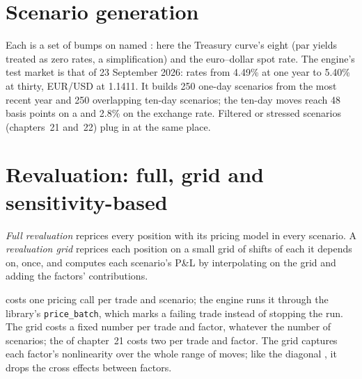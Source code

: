 \section{Scenario generation}

Each  is a set of bumps on named : here the Treasury curve's eight
 (par yields treated as zero rates, a simplification) and the euro--dollar spot rate. The
engine's test market is that of 23 September 2026: rates from 4.49\% at one year to 5.40\% at thirty,
EUR/USD at 1.1411. It builds 250 one-day scenarios from the most recent year and 250 overlapping
ten-day scenarios; the ten-day moves reach 48 basis points on a  and 2.8\% on the exchange rate.
Filtered or stressed scenarios (chapters~21 and~22) plug in at the same place.

\section{Revaluation: full, grid and sensitivity-based}

\begin{definition}\label{def:rc:build-a-risk-engine:reval}
\emph{Full revaluation} reprices every position with its pricing model in every
scenario. A \emph{revaluation grid} reprices each position on a small grid of shifts
of each  it depends on, once, and computes each scenario's P\&L by interpolating on the grid and
adding the factors' contributions.
\end{definition}

 costs one pricing call per trade and scenario; the engine runs it through the
library's \texttt{price\_batch}, which marks a failing trade instead of stopping the run. The grid costs a fixed number per trade
and factor, whatever the number of scenarios; the  of chapter~21 costs two per
trade and factor. The grid captures each factor's nonlinearity over the whole range of moves; like the
diagonal , it drops the cross effects between factors.

